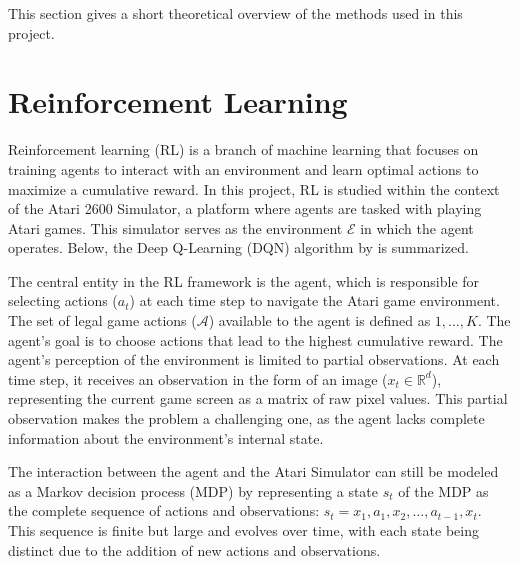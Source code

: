 This section gives a short theoretical overview of the methods used in this project.

\section{Reinforcement Learning}

Reinforcement learning (RL) is a branch of machine learning that focuses on training agents to interact with an environment and learn optimal actions to maximize a cumulative reward. In this project, RL is studied within the context of the Atari 2600 Simulator, a platform where agents are tasked with playing Atari games. This simulator serves as the environment $\mathcal{E}$ in which the agent operates. Below, the Deep Q-Learning (DQN) algorithm by \textcite{mnih_playing_2013} is summarized.

The central entity in the RL framework is the agent, which is responsible for selecting actions ($a_t$) at each time step to navigate the Atari game environment. The set of legal game actions ($\mathcal A$) available to the agent is defined as ${1, \dots, K}$. The agent's goal is to choose actions that lead to the highest cumulative reward. The agent's perception of the environment is limited to partial observations. At each time step, it receives an observation in the form of an image ($x_t \in \mathbb R^d$), representing the current game screen as a matrix of raw pixel values. This partial observation makes the problem a challenging one, as the agent lacks complete information about the environment's internal state.

The interaction between the agent and the Atari Simulator can still be modeled as a Markov decision process (MDP) by representing a state $s_t$ of the MDP as the complete sequence of actions and observations: $s_t = x_1, a_1, x_2, \dots, a_{t-1}, x_t$. This sequence is finite but large and evolves over time, with each state being distinct due to the addition of new actions and observations.

